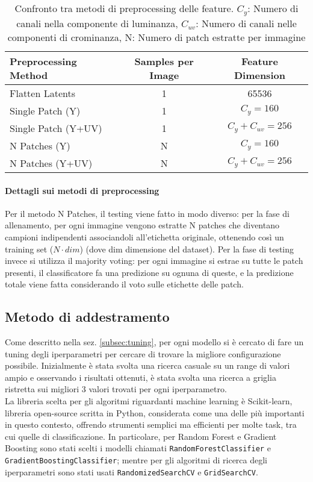\begin{table}[H]
\centering
\caption{Confronto tra metodi di preprocessing delle feature. $C_y$: Numero di canali nella componente di luminanza, $C_{uv}$: Numero di canali nelle componenti di crominanza, N: Numero di patch estratte per immagine}\label{tab:preprocessing_methods}
\begin{tabularx}{\textwidth}{l c c}
\toprule
\textbf{Preprocessing Method} & \textbf{Samples per Image} & \textbf{Feature Dimension} \\
\midrule
Flatten Latents         & 1 & 65536 \\
Single Patch (Y)        & 1 & $C_y = 160$ \\
Single Patch (Y+UV)     & 1 & $C_y + C_{uv} = 256$ \\
N Patches (Y)    & N & $C_y = 160$ \\
N Patches (Y+UV)        & N & $C_y + C_{uv} = 256$ \\
\bottomrule
\end{tabularx}
\end{table}
\paragraph{Dettagli sui metodi di preprocessing}
Per il metodo N Patches, il testing viene fatto in modo diverso: per la fase di allenamento, per ogni immagine vengono estratte N patches che diventano campioni indipendenti associandoli all'etichetta originale, ottenendo così un training set ($N\cdot dim$) (dove dim dimensione del dataset). Per la fase di testing invece si utilizza il majority voting: per ogni immagine si estrae su tutte le patch presenti, il classificatore fa una predizione su ognuna di queste, e la predizione totale viene fatta considerando il voto sulle etichette delle patch.\\
\subsection{Metodo di addestramento}
Come descritto nella sez. \ref{subsec:tuning}, per ogni modello si è cercato di fare un tuning degli iperparametri per cercare di trovare la migliore configurazione possibile.
Inizialmente è stata svolta una ricerca casuale su un range di valori ampio e osservando i risultati ottenuti, è stata svolta una ricerca a griglia ristretta sui migliori 3 valori trovati per ogni iperparametro.\\
La libreria scelta per gli algoritmi riguardanti machine learning è Scikit-learn, libreria open-source scritta in Python, considerata come una delle più importanti in questo contesto, offrendo strumenti semplici ma efficienti per molte task, tra cui quelle di classificazione.
In particolare, per Random Forest e Gradient Boosting sono stati scelti i modelli chiamati \texttt{RandomForestClassifier} e \texttt{GradientBoostingClassifier}; mentre per gli algoritmi di ricerca degli iperparametri sono stati usati \texttt{RandomizedSearchCV} e \texttt{GridSearchCV}.
